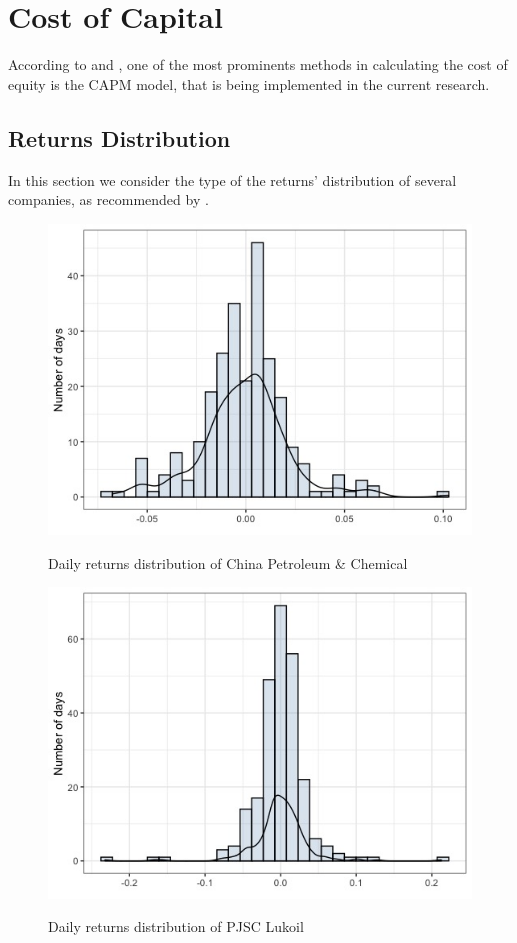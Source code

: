\documentclass [a4paper, 11pt] {article}
\begin{document}
\clearpage
\section {Cost of Capital}
According to \cite{DamodaranDark} and \cite{BestPract}, one of the most prominents methods in calculating the cost of equity is the CAPM model, that is being implemented in the current research.

\subsection {Returns Distribution}

In this section we consider the type of the returns' distribution of several companies, as recommended by \cite{Fishman}.

\begin{figure}[h]
\caption{Daily returns distribution of China Petroleum \& Chemical}
\includegraphics[scale=0.65]{snp_hist}
\label{fig:hist1}
\end{figure}

\begin{figure}[h]
\caption{Daily returns distribution of PJSC Lukoil}
\includegraphics[scale=0.65]{LUKOIL_hist}
\label{fig:hist1}
\end{figure}
\end{document}
